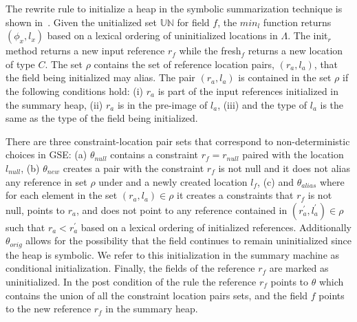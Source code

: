 
The rewrite rule to initialize a heap in the symbolic summarization
technique is shown in~. Given the unitialized set
$\mathbb{UN}$ for field $f$, the $\mathit{min}_l$ function returns
$(\phi_x, l_x)$ based on a lexical ordering of uninitialized locations
in $\Lambda$. The init$_r$ method returns a new input reference $r_f$
while the fresh$_f$ returns a new location of type $C$. The set $\rho$
contains the set of reference location pairs, $(r_a, l_a)$, that the
field being initialized may alias. The pair $(r_a, l_a)$ is contained
in the set $ \rho $ if the following conditions hold: (i) $r_a$ is
part of the input references initialized in the summary heap, (ii)
$r_a$ is in the pre-image of $l_a$, (iii) and the type of $l_a$ is the
same as the type of the field being initialized.

There are three constraint-location pair sets that correspond to
non-deterministic choices in GSE: (a) $\theta_\mathit{null}$ contains
a constraint $r_f = r_\mathit{null}$ paired with the location
$l_\mathit{null}$, (b) $\theta_\mathit{new}$ creates a pair with the
constraint $r_f$ is not null and it does not alias any reference in
set $\rho$ under and a newly created location $l_f$, (c) and
$\theta_\mathit{alias}$ where for each element in the set $(r_a, l_a)
\in \rho$ it creates a constraints that $r_f$ is not null, points to
$r_a$, and does not point to any reference contained in $(r_a^\prime,
l_a^\prime) \in \rho$ such that $r_a < r_a^\prime$ based on a lexical
ordering of initialized references. Additionally
$\theta_\mathit{orig}$ allows for the possibility that the field
continues to remain uninitialized since the heap is symbolic. We refer
to this initialization in the summary machine as conditional
initialization. Finally, the fields of the reference $r_f$ are marked
as uninitialized. In the post condition of the rule the reference
$r_f$ points to $\theta$ which contains the union of all the
constraint location pairs sets, and the field $f$ points to the new
reference $r_f$ in the summary heap.

\begin{comment}
 Note that the summarize rule invoked repeatedly until
the set of unitialized constraint location pairs for field $f$ is
empty. In other words the set $\Lambda$ is empty. This consititutes
the summarize end rule in~\figref{fig:symInit}.
\end{comment}

